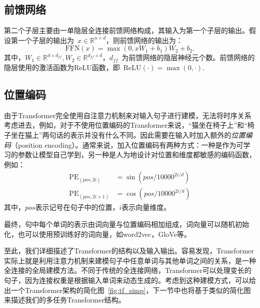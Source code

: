 \subsection{前馈网络}
第二个子层主要由一单隐层全连接前馈网络构成，其输入为第一个子层的输出。假设第一个子层的输出为~$x\in \mathbb{R}^{n\times d}$，则前馈网络的输出为：
\begin{equation}
	\mathrm{FFN}(x) = \max(0, xW_1+b_1)W_2+b_2.
\end{equation}
其中，$W_1 \in \mathbb{R}^{d\times d_{ff}}, W_2 \in \mathbb{R}^{d_{ff} \times d}$，$d_{ff}$~为前馈网络的隐层神经元个数。前馈网络的隐层使用的激活函数为ReLU函数，即~$\mathrm{ReLU}(\cdot)=\max(0, \cdot)$.

\subsection{位置编码}
由于Transformer完全使用自注意力机制来对输入句子进行建模，无法将时序关系考虑进去，例如，对于不使用位置编码的Transformer来说，“猫坐在椅子上”和“椅子坐在猫上”两句话的表示并没有什么不同。因此需要在输入时加入额外的\emph{位置编码}（position encoding）。通常来说，加入位置编码有两种方式：一种是作为可学习的参数让模型自己学到，另一种是人为地设计对位置和维度都敏感的编码函数，例如：
\begin{equation}
	\begin{aligned}
	\mathrm{PE}_{(pos, 2i)} &= \sin(pos/10000^{2i/d})\\
	\mathrm{PE}_{(pos, 2i+1)} &= \cos(pos/10000^{2i/d})
	\end{aligned}
\end{equation}
其中，$pos$表示记号在句子中的位置，$i$表示向量维度。

最终，句中每个单词的表示由词向量与位置编码相加组成，词向量可以随机初始化，也可以使用预训练好的词向量，如word2vec，GloVe等。

至此，我们详细描述了Transformer的结构以及输入输出。容易发现，Transformer实际上就是利用注意力机制来建模句子中任意单词与其他单词之间的关系，是一种全连接的全局建模方法。不同于传统的全连接网络，Transformer可以处理变长的句子，因为连接权重是根据输入单词来动态生成的。考虑到这种建模方式，可以给出一个Transformer架构的简化图~\ref{fig:tf_simp}，下一节中也将基于类似的简化图来描述我们的多任务Transformer结构。

